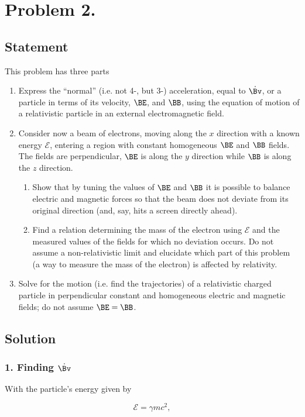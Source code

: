 \section{Problem 2.}
\subsection{Statement}

This problem has three parts
\begin{enumerate}
\item Express the ``normal'' (i.e. not 4-, but 3-) acceleration, equal to $\dot{\Bv}$, or a particle in terms of its velocity, $\BE$, and $\BB$, using the equation of motion of a relativistic particle in an external electromagnetic field.
\item Consider now a beam of electrons, moving along the $x$ direction with a known energy $\mathcal{E}$, entering a region with constant homogeneous $\BE$ and $\BB$ fields.  The fields are perpendicular, $\BE$ is along the $y$ direction while $\BB$ is along the $z$ direction.
\begin{enumerate}
\item
Show that by tuning the values of $\BE$ and $\BB$ it is possible to balance electric and magnetic forces so that the beam does not deviate from its original direction (and, say, hits a screen directly ahead).
\item Find a relation determining the mass of the electron using $\mathcal{E}$ and the measured values of the fields for which no deviation occurs.  Do not assume a non-relativistic limit and elucidate which part of this problem (a way to measure the mass of the electron) is affected by relativity.
\end{enumerate}
\item Solve for the motion (i.e. find the trajectories) of a relativistic charged particle in perpendicular constant and homogeneous electric and magnetic fields; do not assume $\BE = \BB$.
\end{enumerate}
\subsection{Solution}
\subsubsection{1. Finding $\dot{\Bv}$}

With the particle's energy given by

\begin{equation}\label{eqn:relElectroDynProblemSet2:150}
\mathcal{E} = \gamma m c^2,
\end{equation}

